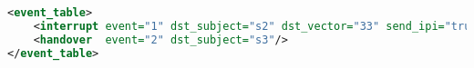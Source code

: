 \begin{lstlisting}[language=xml, caption=Subject event table]
<event_table>
    <interrupt event="1" dst_subject="s2" dst_vector="33" send_ipi="true"/>
    <handover  event="2" dst_subject="s3"/>
</event_table>
\end{lstlisting}
